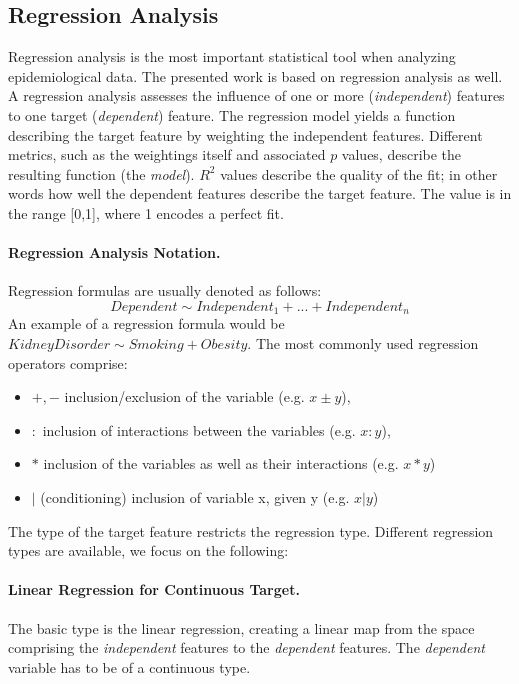 \documentclass[journal]{style/vgtc} 			          %
\begin{document}
\subsection{Regression Analysis} \label{sec:RegressionAnalysis}
Regression analysis is the most important statistical tool when analyzing epidemiological data.
The presented work is based on regression analysis as well.
A regression analysis assesses the influence of one or more (\emph{independent}) features to one target (\emph{dependent}) feature.
The regression model yields a function describing the target feature by weighting the independent features.
Different metrics, such as the weightings itself and associated $p$ values, describe the resulting function (the \emph{model}).
$R^2$ values describe the quality of the fit; in other words how well the dependent features describe the target feature.
The value is in the range [0,1], where 1 encodes a perfect fit.

\paragraph{Regression Analysis Notation.} Regression formulas are usually denoted as follows:
\begin{equation}
Dependent \sim Independent_1 + ... + Independent_n
\label{eq:RegressionNotation}
\end{equation}
An example of a regression formula would be $KidneyDisorder \sim Smoking + Obesity$.
The most commonly used regression operators comprise:
\begin{itemize}
	\item $+,-$ inclusion/exclusion of the variable (e.g. $x\pm y$),
	\item $:$ inclusion of interactions between the variables (e.g. $x:y$),
	\item $*$ inclusion of the variables as well as their interactions (e.g. $x*y$)
	\item $|$ (conditioning) inclusion of variable x, given y (e.g. $x|y$)
\end{itemize}
The type of the target feature restricts the regression type.
Different regression types are available, we focus on the following:
\paragraph{Linear Regression for Continuous Target.} The basic type is the linear regression, creating a linear map from the space comprising the \emph{independent} features to the \emph{dependent} features.
The \emph{dependent} variable has to be of a continuous type.
\end{document}
